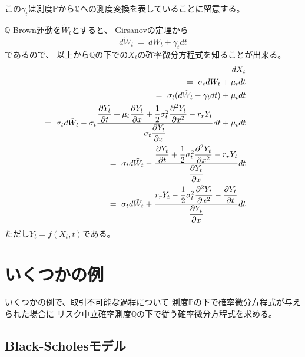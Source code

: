 \documentclass[uplatex,a4j,12pt,dvipdfmx]{jsarticle}
\begin{document}
この$\gamma_{t}$は測度$\mathbb{P}$から$\mathbb{Q}$への測度変換を表していることに留意する。

$\mathbb{Q}$-Brown運動を$\tilde{W}_{t}$とすると、
Girsanovの定理から
$$
	d \tilde{W}_{t}
	\ = \
	d W_{t} + \gamma_{t} dt
$$
であるので、
以上から$\mathbb{Q}$の下での$X_{t}$の確率微分方程式を知ることが出来る。
%
%
\begin{eqnarray*}
	&&
	\hspace{-10mm}
	d X_{t}
	\\ && \hspace{-10mm} = \
	\sigma_{t} d W_{t} + \mu_{t} dt
	\\ && \hspace{-10mm} = \
	\sigma_{t} (d \tilde{W}_{t} - \gamma_{t} dt) + \mu_{t} dt
	\\ && \hspace{-10mm} = \
	\sigma_{t} d \tilde{W}_{t} - \sigma_{t}
	\dfrac{
		\dfrac{ \partial Y_{t} }{ \partial t }
		+
		\mu_{t}
		\dfrac{ \partial Y_{t} }{ \partial x }
		+
		\dfrac{1}{2}
		\sigma_{t}^{2}
		\dfrac{ \partial^{2} Y_{t} }{ \partial x^{2} } - r_{r} Y_{t}
	}
	{ \sigma_{t}
		\dfrac{ \partial Y_{t} }{ \partial x }
	}
	dt + \mu_{t} dt
	\\ && \hspace{-10mm} = \
	\sigma_{t} d \tilde{W}_{t}
	-
	\dfrac{
		\dfrac{ \partial Y_{t} }{ \partial t }
		+
		\dfrac{1}{2}
		\sigma_{t}^{2}
		\dfrac{ \partial^{2} Y_{t} }{ \partial x^{2} } - r_{r} Y_{t}
	}
	{
		\dfrac{ \partial Y_{t} }{ \partial x }
	}
	dt
	\\ && \hspace{-10mm} = \
	\sigma_{t} d \tilde{W}_{t}
	+
	\dfrac{
		r_{r} Y_{t}
		-
		\dfrac{1}{2}
		\sigma_{t}^{2}
		\dfrac{ \partial^{2} Y_{t} }{ \partial x^{2} }
		-
		\dfrac{ \partial Y_{t} }{ \partial t }
	}
	{
		\dfrac{ \partial Y_{t} }{ \partial x }
	}
	dt
\end{eqnarray*}
%
%
ただし$Y_{t} = f(X_{t},t)$である。

\section*{いくつかの例}

いくつかの例で、取引不可能な過程について
測度$\mathbb{P}$の下で確率微分方程式が与えられた場合に
リスク中立確率測度$\mathbb{Q}$の下で従う確率微分方程式を求める。

\subsection*{Black-Scholesモデル}
\end{document}

